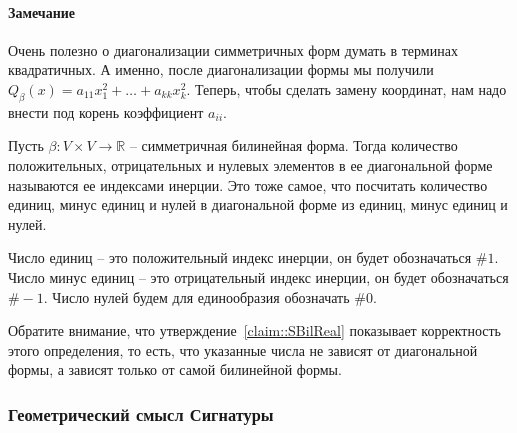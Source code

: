 \paragraph{Замечание} Очень полезно о диагонализации симметричных форм думать в терминах квадратичных. А именно, после диагонализации формы мы получили $Q_\beta(x) = a_{11}x_1^2 + \ldots +a_{kk}x_k^2$. Теперь, чтобы сделать замену координат, нам надо внести под корень коэффициент $a_{ii}$.

\begin{definition}
Пусть $\beta\colon V\times V\to \mathbb R$ -- симметричная билинейная форма. Тогда количество положительных, отрицательных и нулевых элементов в ее диагональной форме называются ее индексами инерции. Это тоже самое, что посчитать количество единиц, минус единиц и нулей в диагональной форме из единиц, минус единиц и нулей.

Число единиц -- это положительный индекс инерции, он будет обозначаться $\#1$. Число минус единиц -- это отрицательный индекс инерции, он будет обозначаться $\#-1$. Число нулей будем для единообразия обозначать $\#0$.
\end{definition}

Обратите внимание, что утверждение~\ref{claim::SBilReal} показывает корректность этого определения, то есть, что указанные числа не зависят от диагональной формы, а зависят только от самой билинейной формы.



\subsubsection{Геометрический смысл Сигнатуры}

